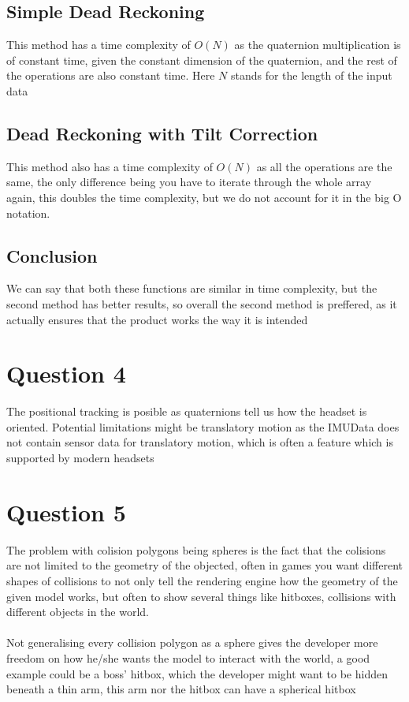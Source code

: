 \documentclass[11pt]{article}
\begin{document}
\subsection{Simple Dead Reckoning}
This method has a time complexity of $O(N)$ as the quaternion multiplication is of constant time, given the constant dimension of the quaternion, and the rest of the operations are also constant time. Here $N$ stands for the length of the input data
\subsection{Dead Reckoning with Tilt Correction}
This method also has a time complexity of $O(N)$ as all the operations are  the same, the only difference being you have to iterate through the whole array again, this doubles the time complexity, but we do not account for it in the big O notation.
\subsection{Conclusion}
We can say that both these functions are similar in time complexity, but the second method has better results, so overall the second method is preffered, as it actually ensures that the product works the way it is intended
\pagebreak
\section{Question 4}
The positional tracking is posible as quaternions tell us how the headset is oriented. Potential limitations might be translatory motion as the IMUData does not contain sensor data for translatory motion, which is often a feature which is supported by modern headsets
\pagebreak
\section{Question 5}
The problem with colision polygons being spheres is the fact that the colisions are not limited to the geometry of the objected, often in games you want different shapes of collisions to not only tell the rendering engine how the geometry of the given model works, but often to show several things like hitboxes, collisions with different objects in the world.\\\\
Not generalising every collision polygon as a sphere gives the developer more freedom on how he/she wants the model to interact with the world, a good example could be a boss' hitbox, which the developer might want to be hidden beneath a thin arm, this arm nor the hitbox can have a spherical hitbox
\pagebreak
\end{document}
